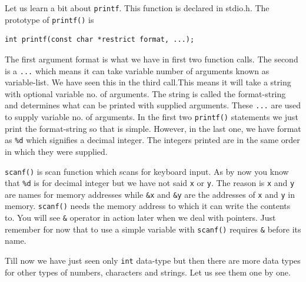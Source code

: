 Let us learn a bit about \texttt{printf}. This function is declared in
stdio.h. The prototype of \texttt{printf()} is

\begin{Verbatim}[frame=single]
int printf(const char *restrict format, ...);
\end{Verbatim}

The first argument format is what we have in first two function calls. The
second is a \texttt{...} which means it can take variable number of arguments
known as variable-list. We have seen this in the third call.This means it will
take a string with optional variable no. of arguments. The string is called the
format-string and determines what can be printed with supplied arguments. These
\texttt{...} are used to supply variable no. of arguments. In the first two
\texttt{printf()} statements we just print the format-string so that is
simple. However, in the last one, we have format as \texttt{\%d} which
signifies a decimal integer. The integers printed are in the same order in
which they were supplied.

\texttt{scanf()} is scan function which scans for keyboard input. As by now you
know that \texttt{\%d} is for decimal integer but we have not said \texttt{x}
or \texttt{y}. The reason is \texttt{x} and \texttt{y} are names for memory
addresses while
\texttt{\&x} and \texttt{\&y} are the addresses of \texttt{x} and \texttt{y} in
memory. \texttt{scanf()} needs the memory address to which it can write the
contents to. You will see \texttt{\&} operator in action later when we deal
with pointers. Just remember for now that to use a simple variable with
\texttt{scanf()} requires \texttt{\&} before its name.

Till now we have just seen only \texttt{int} data-type but then there are more
data types for other types of numbers, characters and strings. Let us see them
one by one.

